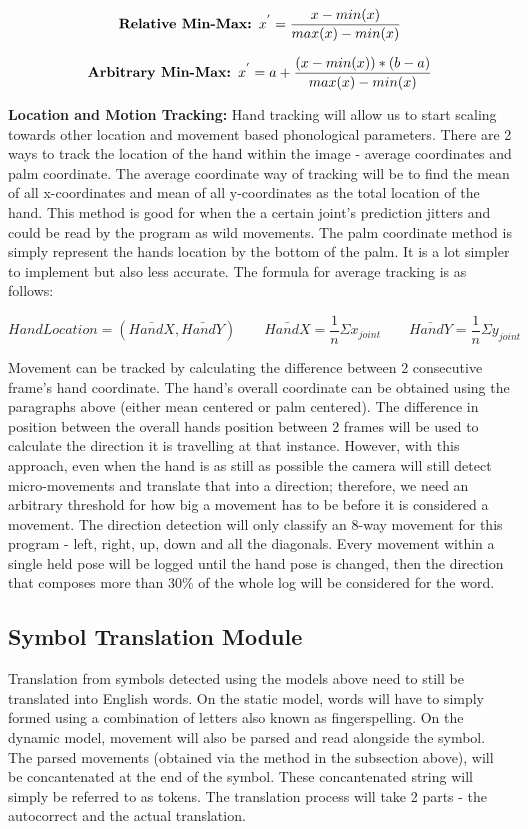 \documentclass[11pt]{article}
\def\paraskip{\vskip 0.4cm}
\begin{document}
        \vskip 0.3cm
        \[
        \text{\bf{Relative Min-Max: }} x^{'} = \frac{x-min(x)}{max(x)-min(x)} 
        \]

        \[
        \text{\bf{Arbitrary Min-Max: }} x^{'} = a + \frac{(x-min(x))*(b-a)}{max(x)-min(x)}
        \] 
        \vskip 0.3cm

        \paraskip

        \noindent\textbf{Location and Motion Tracking: } Hand tracking will allow us to start scaling towards other location and movement based phonological parameters. There are 2 ways to track the location of the hand within the image - average coordinates and palm coordinate. The average coordinate way of tracking will be to find the mean of all x-coordinates and mean of all y-coordinates as the total location of the hand. This method is good for when the a certain joint's prediction jitters and could be read by the program as wild movements. The palm coordinate method is simply represent the hands location by the bottom of the palm. It is a lot simpler to implement but also less accurate. The formula for average tracking is as follows:

        \[HandLocation = (\bar{HandX}, \bar{HandY}) \qquad{}
        \bar{HandX} = \frac{1}{n}\Sigma x_{joint} \qquad{}
        \bar{HandY}  = \frac{1}{n}\Sigma y_{joint}
        \]
        \vskip 0.3cm

        Movement can be tracked by calculating the difference between 2 consecutive frame's hand coordinate. The hand's overall coordinate can be obtained using the paragraphs above (either mean centered or palm centered). The difference in position between the overall hands position between 2 frames will be used to calculate the direction it is travelling at that instance. However, with this approach, even when the hand is as still as possible the camera will still detect micro-movements and translate that into a direction; therefore, we need an arbitrary threshold for how big a movement has to be before it is considered a movement. The direction detection will only classify an 8-way movement for this program - left, right, up, down and all the diagonals. Every movement within a single held pose will be logged until the hand pose is changed, then the direction that composes more than 30\% of the whole log will be considered for the word. 


        \subsection{Symbol Translation Module}
        Translation from symbols detected using the models above need to still be translated into English words. On the static model, words will have to simply formed using a combination of letters also known as fingerspelling. On the dynamic model, movement will also be parsed and read alongside the symbol. The parsed movements (obtained via the method in the subsection above), will be concantenated at the end of the symbol. These concantenated string will simply be referred to as tokens. The translation process will take 2 parts - the autocorrect and the actual translation. 
        
\end{document}

